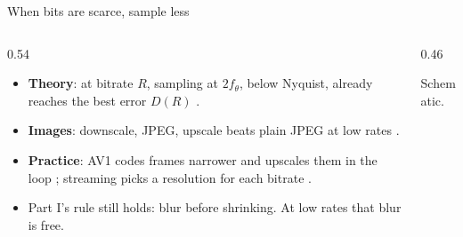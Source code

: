 \documentclass[aspectratio=169]{beamer}
\begin{document}
\begin{frame}{When bits are scarce, sample less}
  \begin{columns}[T]
    \begin{column}{0.54\textwidth}
      \begin{itemize}
        \item \textbf{Theory}: at bitrate $R$, sampling at $2f_\theta$, below Nyquist, already reaches the best error $D(R)$ \cite{kipnis2016,kipnis2018}.
        \item \textbf{Images}: downscale, JPEG, upscale beats plain JPEG at low rates \cite{bruckstein2003}.
        \item \textbf{Practice}: AV1 codes frames narrower and upscales them in the loop \cite{av1overview}; streaming picks a resolution for each bitrate \cite{netflix2015}.
        \item Part I's rule still holds: blur before shrinking. At low rates that blur is free.
      \end{itemize}
    \end{column}
    \begin{column}{0.46\textwidth}
      \begin{center}
      \end{center}
      {\small Schematic.}
    \end{column}
  \end{columns}
\end{frame}
\end{document}
